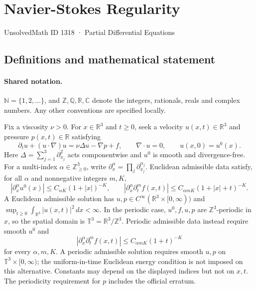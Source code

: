 \documentclass[11pt]{article}
\begin{document}
\setcounter{section}{1317}
\section{Navier-Stokes Regularity}\label{1318}
{\small\sffamily UnsolvedMath ID 1318 · Partial Differential Equations}
\subsection{Definitions and mathematical statement}

\paragraph{Shared notation.}$\mathbb N=\{1,2,\ldots\}$, and $\mathbb Z,\mathbb Q,\mathbb R,\mathbb C$ denote the integers, rationals, reals and complex numbers. Any other conventions are specified locally.


Fix a viscosity $\nu>0$. For $x\in\mathbb R^3$ and $t\geq0$, seek a velocity $u(x,t)\in\mathbb R^3$ and pressure $p(x,t)\in\mathbb R$ satisfying
\[
\partial_tu+(u\cdot\nabla)u=\nu\Delta u-\nabla p+f,\qquad \nabla\cdot u=0,\qquad u(x,0)=u^0(x).
\]
Here $\Delta=\sum_{j=1}^3\partial_{x_j}^2$ acts componentwise and $u^0$ is smooth and divergence-free. For a multi-index $\alpha\in\mathbb Z_{\geq0}^3$, write $\partial_x^\alpha=\prod_j\partial_{x_j}^{\alpha_j}$. Euclidean admissible data satisfy, for all $\alpha$ and nonnegative integers $m,K$,
\[
|\partial_x^\alpha u^0(x)|\leq C_{\alpha K}(1+|x|)^{-K},\qquad
|\partial_x^\alpha\partial_t^mf(x,t)|\leq C_{\alpha mK}(1+|x|+t)^{-K}.
\]
A Euclidean admissible solution has $u,p\in C^\infty(\mathbb R^3\times[0,\infty))$ and $\sup_{t\geq0}\int_{\mathbb R^3}|u(x,t)|^2\,dx<\infty$. In the periodic case, $u^0,f,u,p$ are $\mathbb Z^3$-periodic in $x$, so the spatial domain is $\mathbb T^3=\mathbb R^3/\mathbb Z^3$. Periodic admissible data instead require smooth $u^0$ and
\[
|\partial_x^\alpha\partial_t^mf(x,t)|\leq C_{\alpha mK}(1+t)^{-K}
\]
for every $\alpha,m,K$. A periodic admissible solution requires smooth $u,p$ on $\mathbb T^3\times[0,\infty)$; the uniform-in-time Euclidean energy condition is not imposed on this alternative. Constants may depend on the displayed indices but not on $x,t$. The periodicity requirement for $p$ includes the official erratum.
\end{document}
